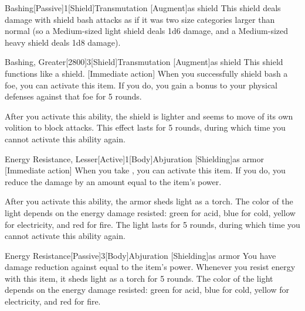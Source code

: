        \begin{magicitemdef}{Bashing}[Passive]{1}[Shield]{Transmutation [Augment]}{as shield}
             This shield deals damage with shield bash attacks as if it was two size categories larger than normal (so a Medium-sized light shield deals 1d6 damage, and a Medium-sized heavy shield deals 1d8 damage).
        \end{magicitemdef}

        \begin{magicitemdef}{Bashing, Greater}[2800]{3}[Shield]{Transmutation [Augment]}{as shield}
             This shield functions like a  shield.
            [Immediate action] When you successfully shield bash a foe, you can activate this item. If you do, you gain a  bonus to your physical defenses against that foe for 5 rounds.

            After you activate this ability, the shield is lighter and seems to move of its own volition to block attacks.
            This effect lasts for 5 rounds, during which time you cannot activate this ability again.
        \end{magicitemdef}

        \begin{magicitemdef}{Energy Resistance, Lesser}[Active]{1}[Body]{Abjuration [Shielding]}{as armor}
            [Immediate action] When you take , you can activate this item. If you do, you reduce the damage by an amount equal to the item's power.

            After you activate this ability, the armor sheds light as a torch.
            The color of the light depends on the energy damage resisted: green for acid, blue for cold, yellow for electricity, and red for fire.
            The light lasts for 5 rounds, during which time you cannot activate this ability again.
        \end{magicitemdef}

        \begin{magicitemdef}{Energy Resistance}[Passive]{3}[Body]{Abjuration [Shielding]}{as armor}
             You have damage reduction against  equal to the item's power.
            Whenever you resist energy with this item, it sheds light as a torch for 5 rounds.
            The color of the light depends on the energy damage resisted: green for acid, blue for cold, yellow for electricity, and red for fire.
        \end{magicitemdef}

